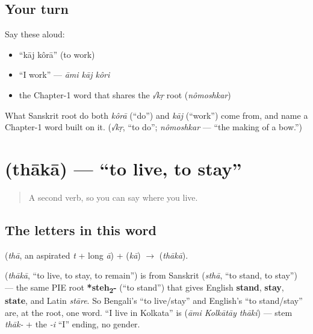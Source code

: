 \subsection*{Your turn}
Say these aloud:

\begin{itemize}
\raggedright
  \item \textquotedblleft{}kāj kôrā\textquotedblright{} (to work)
  \item \textquotedblleft{}I work\textquotedblright{} — \emph{āmi kāj kôri}
  \item the Chapter-1 word that shares the \emph{√kṛ} root (\emph{nômoshkar})
\end{itemize}

\begin{tcolorbox}[breakable,colback=teal!4,colframe=teal!35!black,title={Before you move on}]
What Sanskrit root do both \emph{kôrā} (\textquotedblleft{}do\textquotedblright{}) and \emph{kāj} (\textquotedblleft{}work\textquotedblright{}) come from, and name a Chapter-1 word built on it. (\emph{√kṛ}, \textquotedblleft{}to do\textquotedblright{}; \emph{nômoshkar} — \textquotedblleft{}the making of a bow.\textquotedblright{})
\end{tcolorbox}
\section[thākā]{ (thākā) — \textquotedblleft{}to live, to stay\textquotedblright{}}

\label{lesson:BN-C05-thaka}



\begin{quote}
A second verb, so you can say where you live.
\end{quote}

\subsection*{The letters in this word}
\textbf{} (\emph{thā}, an aspirated \emph{t} + long \emph{ā}) + \textbf{} (\emph{kā}) $\to$ \textbf{} (\emph{thākā}).

\begin{cousinweb}
\textbf{} (\emph{thākā}, \textquotedblleft{}to live, to stay, to remain\textquotedblright{}) is from Sanskrit \textbf{} (\emph{sthā}, \textquotedblleft{}to stand, to stay\textquotedblright{}) — the same PIE root \textbf{*steh\textsubscript{2}-} (\textquotedblleft{}to stand\textquotedblright{}) that gives English \textbf{stand}, \textbf{stay}, \textbf{state}, and Latin \emph{stāre}. So Bengali's \textquotedblleft{}to live/stay\textquotedblright{} and English's \textquotedblleft{}to stand/stay\textquotedblright{} are, at the root, one word. \textquotedblleft{}I live in Kolkata\textquotedblright{} is \textbf{  } (\emph{āmi Kolkātāy thāki}) — stem \emph{thāk-} + the \emph{-i} \textquotedblleft{}I\textquotedblright{} ending, no gender.
\end{cousinweb}

